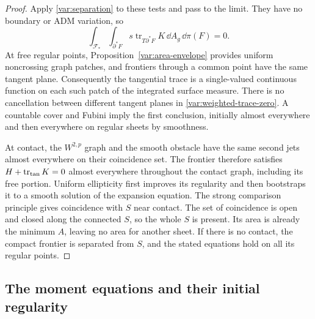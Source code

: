 \begin{proof}
Apply \eqref{var:separation} to these tests and pass to the
limit.  They have no boundary or ADM variation, so
\begin{equation}
 \int_{\mathcal F_*}\int_{\partial^*F}
       s\operatorname{tr}_{T\partial^*F}K\,\dd A_g\,\dd\pi(F)=0.
 \label{var:weighted-trace-zero}
\end{equation}
At free regular points, Proposition~\ref{var:area-envelope}
provides uniform noncrossing graph patches, and frontiers
through a common point have the same tangent plane.
Consequently the tangential trace is a single-valued
continuous function on each such patch of the integrated
surface measure.  There is no cancellation between different
tangent planes in \eqref{var:weighted-trace-zero}.
A countable cover and Fubini imply the first conclusion,
initially almost everywhere and then everywhere on regular
sheets by smoothness.

At contact, the $W^{2,p}$ graph and the smooth obstacle have
the same second jets almost everywhere on their coincidence
set.  The frontier therefore satisfies
$H+\operatorname{tr}_{\rm tan}K=0$ almost everywhere throughout
the contact graph, including its free portion.  Uniform
ellipticity first improves its regularity and then bootstraps
it to a smooth solution of the expansion equation.  The
strong comparison principle gives coincidence with $S$ near
contact.  The set of coincidence is open and closed along
the connected $S$, so the whole $S$ is present.  Its area is
already the minimum $A$, leaving no area for another sheet.
If there is no contact, the compact frontier is separated
from $S$, and the stated equations hold on all its regular
points.
\end{proof}

\subsection{The moment equations and their initial regularity}

